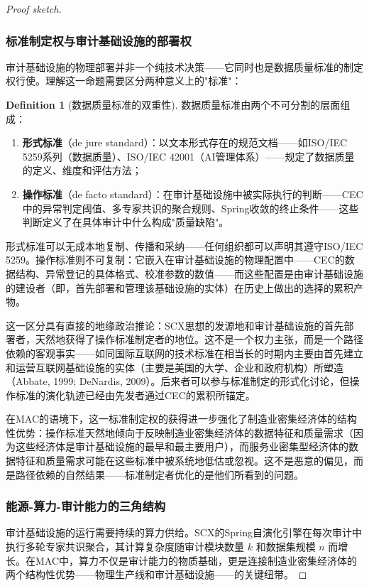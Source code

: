 \documentclass[12pt,a4paper]{ctexart}
\theoremstyle{definition}
\newtheorem{definition}{Definition}[section]
\theoremstyle{remark}
\begin{document}
\begin{proof}[Proof sketch]
\subsubsection*{标准制定权与审计基础设施的部署权}

审计基础设施的物理部署并非一个纯技术决策——它同时也是数据质量标准的制定权行使。理解这一命题需要区分两种意义上的"标准"：

\begin{definition}[数据质量标准的双重性]
数据质量标准由两个不可分割的层面组成：
\begin{enumerate}[label=(\alph*)]
    \item \textbf{形式标准}（de jure standard）：以文本形式存在的规范文档——如ISO/IEC 5259系列（数据质量）、ISO/IEC 42001（AI管理体系）——规定了数据质量的定义、维度和评估方法；
    \item \textbf{操作标准}（de facto standard）：在审计基础设施中被实际执行的判断——CEC中的异常判定阈值、多专家共识的聚合规则、Spring收敛的终止条件——这些判断定义了在具体审计中什么构成"质量缺陷"。
\end{enumerate}
形式标准可以无成本地复制、传播和采纳——任何组织都可以声明其遵守ISO/IEC 5259。操作标准则不可复制：它嵌入在审计基础设施的物理配置中——CEC的数据结构、异常登记的具体格式、校准参数的数值——而这些配置是由审计基础设施的建设者（即，首先部署和管理该基础设施的实体）在历史上做出的选择的累积产物。
\end{definition}

这一区分具有直接的地缘政治推论：SCX思想的发源地和审计基础设施的首先部署者，天然地获得了操作标准制定者的地位。这不是一个权力主张，而是一个路径依赖的客观事实——如同国际互联网的技术标准在相当长的时期内主要由首先建立和运营互联网基础设施的实体（主要是美国的大学、企业和政府机构）所塑造（Abbate, 1999; DeNardis, 2009）。后来者可以参与标准制定的形式化讨论，但操作标准的演化轨迹已经由先发者通过CEC的累积所锚定。

在MAC的语境下，这一标准制定权的获得进一步强化了制造业密集经济体的结构性优势：操作标准天然地倾向于反映制造业密集经济体的数据特征和质量需求（因为这些经济体是审计基础设施的最早和最主要用户），而服务业密集型经济体的数据特征和质量需求可能在这些标准中被系统地低估或忽视。这不是恶意的偏见，而是路径依赖的自然结果——标准制定者优化的是他们所看到的问题。

\subsubsection*{能源-算力-审计能力的三角结构}

审计基础设施的运行需要持续的算力供给。SCX的Spring自演化引擎在每次审计中执行多轮专家共识聚合，其计算复杂度随审计模块数量 $k$ 和数据集规模 $n$ 而增长。在MAC中，算力不仅是审计能力的物质基础，更是连接制造业密集经济体的两个结构性优势——物理生产线和审计基础设施——的关键纽带。


\end{proof}
\end{document}
